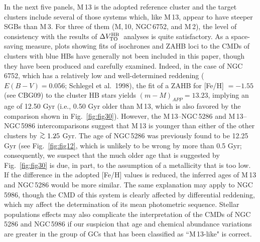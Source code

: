 \documentclass[12pt,preprint]{aastex}
\newcommand\delv{\Delta V^{\rm HB}_{\rm TO}}
\newcommand\gta{\mathrel{\hbox{\raise 0.6 ex \hbox{$>$}\kern
                   -1.7 ex\lower .5 ex\hbox{$\sim$}}}}
\begin{document}
In the next five panels, M$\,$13 is the adopted reference cluster and the 
target clusters include several of those systems which, like M$\,$13, appear
to have steeper SGBs than M$\,$3.  For three of them (M$,$10, NGC$\,$6752,
and M$\,$2), the level of consistency with the results of $\delv$\ analyses
is quite satisfactory.  As a space-saving measure, plots showing fits of
isochrones and ZAHB loci to the CMDs of clusters with blue HBs have generally
not been included in this paper, though they have been produced and carefully
examined.  Indeed, in the case of NGC$\,$6752, which has a relatively low
and well-determined reddening ($E(B-V) = 0.056$; Schlegel et al.~1998), the fit
of a ZAHB for [Fe/H] $= -1.55$ (see CBG09) to the cluster HB stars yields
$(m-M)_{APP} = 13.23$, implying an age of 12.50 Gyr (i.e., 0.50 Gyr older than
M$\,$13, which is also favored by the comparison shown in Fig.~\ref{fig:fig30}).
However, the M$\,$13--NGC$\,$5286 and M$\,$13--NGC$\,$5986 intercomparisons
suggest that M$\,$13 is younger than either of the other clusters by $\gta
1.25$ Gyr.  The age of NGC$\,$5286 was previously found to be 12.25 Gyr (see
Fig.~\ref{fig:fig12}, which is unlikely to be wrong by more than
0.5 Gyr; consequently, we suspect that the much older age that is suggested by
Fig.~\ref{fig:fig30} is due, in part, to the assumption of a metallicity that
is too low.  If the difference in the adopted [Fe/H] values is reduced, the
inferred ages of M$\,$13 and NGC$\,$5286 would be more similar.  The same
explanation may apply to NGC$\,$5986, though the CMD of this system is clearly
affected by differential reddening, which my affect the determination of its
mean photometric sequence.  Stellar populations effects may also
complicate the interpretation of the CMDs of NGC$\,$5286 and NGC$\,$5986 if our
suspicion that age and chemical abundance variations are greater in the group of
GCs that has been classified as ``M$\,$13-like" is correct.
\end{document}
